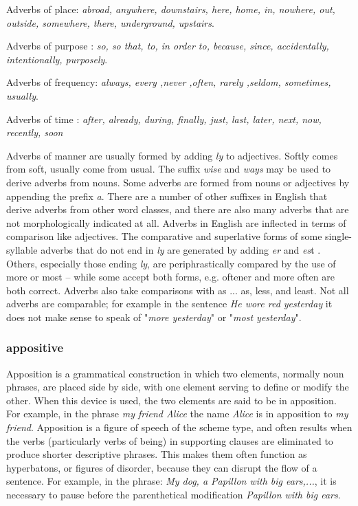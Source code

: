 \begin{small}
Adverbs of place: \emph{abroad, anywhere, downstairs, here, home, in, nowhere, out, outside, somewhere, there, underground, upstairs}.

Adverbs of purpose : \emph{so, so that, to, in order to, because, since, accidentally, intentionally, purposely}.

Adverbs of frequency: \emph{always, every ,never ,often, rarely ,seldom, sometimes, usually}.

Adverbs of time : \emph{after, already, during, finally, just, last, later, next, now, recently, soon}

Adverbs of manner are usually formed by adding \emph{ly} to adjectives. Softly comes from soft, usually come from usual.  The suffix \emph{wise} and \emph{ways} may be used to derive adverbs from nouns. Some adverbs are formed from nouns or adjectives by appending the prefix \emph{a}. There are a number of other suffixes in English that derive adverbs from other word classes, and there are also many adverbs that are not morphologically indicated at all.  Adverbs in English are inflected in terms of comparison like adjectives. The comparative and superlative forms of some single-syllable adverbs that do not end in \emph{ly} are generated by adding \emph{er} and \emph{es}t . Others, especially those ending \emph{ly}, are periphrastically compared by the use of more or most -- while some accept both forms, e.g. oftener and more often are both correct. Adverbs also take comparisons with as ... as, less, and least.  Not all adverbs are comparable; for example in the sentence \emph{He wore red yesterday} it does not make sense to speak of "\emph{more yesterday}" or "\emph{most yesterday}".

\subsubsection{appositive}Apposition is a grammatical construction in which two elements, normally noun phrases, are placed side by side, with one element serving to define or modify the other. When this device is used, the two elements are said to be in apposition. For example, in the phrase \emph{my friend Alice} the name \emph{Alice} is in apposition to \emph{my friend}.  Apposition is a figure of speech of the scheme type, and often results when the verbs (particularly verbs of being) in supporting clauses are eliminated to produce shorter descriptive phrases. This makes them often function as hyperbatons, or figures of disorder, because they can disrupt the flow of a sentence. For example, in the phrase: \emph{My dog, a Papillon with big ears,...}, it is necessary to pause before the parenthetical modification \emph{Papillon with big ears}.


\end{small}
